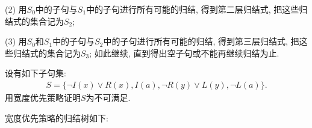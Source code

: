 (2) 用$S_0$中的子句与$S_1$中的子句进行所有可能的归结, 得到第二层归结式, 把这些归结式的集合记为$S_2$;

(3) 用$S_0$和$S_1$中的子句与$S_2$中的子句进行所有可能的归结, 得到第三层归结式, 把这些归结式的集合记为$S_3$;
如此继续, 直到得出空子句或不能再继续归结为止.
\begin{example}
设有如下子句集:
\begin{align}
  S=\{\neg I(x)\vee R(x),  I(a), \neg R(y)\vee L(y), \neg L(a)\}.
\end{align}
用宽度优先策略证明$S$为不可满足.
\end{example}

宽度优先策略的归结树如下:

